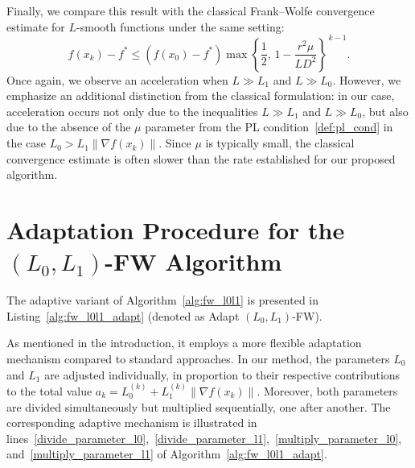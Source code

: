 \documentclass[runningheads]{llncs}
\begin{document}
	Finally, we compare this result with the classical Frank--Wolfe convergence estimate for $L$-smooth functions under the same setting:
	\[
	f(x_k) - f^\ast \le (f(x_0) - f^\ast)
	\max\!\left\{\frac{1}{2},\, 1-\frac{r^2\mu}{L D^2}\right\}^{\,k-1}.
	\]
	Once again, we observe an acceleration when $L \gg L_1$ and $L \gg L_0$.  
	However, we emphasize an additional distinction from the classical formulation: in our case, acceleration occurs not only due to the inequalities $L \gg L_1$ and $L \gg L_0$, but also due to the absence of the $\mu$ parameter from the PL condition~\ref{def:pl_cond} in the case $L_0 > L_1 \|\nabla f(x_k)\|$.  
	Since $\mu$ is typically small, the classical convergence estimate is often slower than the rate established for our proposed algorithm.
	
	\section{Adaptation Procedure for the $(L_0, L_1)$-FW Algorithm}
	
	The adaptive variant of Algorithm~\ref{alg:fw_l0l1} is presented in Listing~\ref{alg:fw_l0l1_adapt} (denoted as Adapt $(L_0, L_1)$-FW).
	
	As mentioned in the introduction, it employs a more flexible adaptation mechanism compared to standard approaches. In our method, the parameters $L_0$ and $L_1$ are adjusted individually, in proportion to their respective contributions to the total value $a_k = L_0^{(k)} + L_1^{(k)} \| \nabla f(x_k) \|$. Moreover, both parameters are divided simultaneously but multiplied sequentially, one after another. The corresponding adaptive mechanism is illustrated in lines~\ref{divide_parameter_l0},~\ref{divide_parameter_l1},~\ref{multiply_parameter_l0}, and~\ref{multiply_parameter_l1} of Algorithm~\ref{alg:fw_l0l1_adapt}.
	
\end{document}
